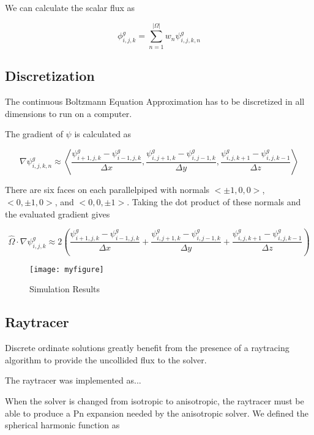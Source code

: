 \documentclass{article}
\numberwithin{equation}{subsection}
\begin{document}
We can calculate the scalar flux as

\begin{equation}
\phi_{i,j,k}^g = \sum_{n=1}^{|\Omega|} w_n \psi_{i,j,k,n}^g
\end{equation}

\subsection{Discretization}
The continuous Boltzmann Equation Approximation has to be discretized in all dimensions to run on a computer.

The gradient of $\psi$ is calculated as

\begin{equation}
\nabla \psi_{i,j,k,n}^g \approx
\left\langle  
\frac{\psi_{i+1,j,k}^g - \psi_{i-1,j,k}^g}{\Delta x},
\frac{\psi_{i,j+1,k}^g - \psi_{i,j-1,k}^g}{\Delta y},
\frac{\psi_{i,j,k+1}^g - \psi_{i,j,k-1}^g}{\Delta z}
\right\rangle
\end{equation}

There are six faces on each parallelpiped with normals $<\pm 1, 0, 0>$, $<0, \pm 1, 0>$, and $<0, 0, \pm 1>$. Taking the dot product of these normals and the evaluated gradient gives

\begin{equation}
\hat{\Omega} \cdot \nabla \psi_{i,j,k}^g \approx
2 \left(
\frac{\psi_{i+1,j,k}^g - \psi_{i-1,j,k}^g}{\Delta x} +
\frac{\psi_{i,j+1,k}^g - \psi_{i,j-1,k}^g}{\Delta y} +
\frac{\psi_{i,j,k+1}^g - \psi_{i,j,k-1}^g}{\Delta z}
\right)
\end{equation}

\begin{figure}
    \centering
    \texttt{[image: myfigure]}
    \caption{Simulation Results}
    \label{simulationfigure}
\end{figure}

\subsection{Raytracer}
Discrete ordinate solutions greatly benefit from the presence of a raytracing algorithm to provide the uncollided flux to the solver.

The raytracer was implemented as...

When the solver is changed from isotropic to anisotropic, the raytracer must be able to produce a Pn expansion needed by the anisotropic solver. We defined the spherical harmonic function as
\end{document}
